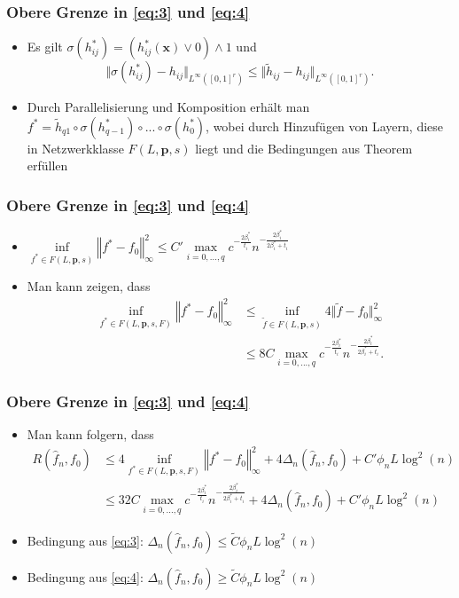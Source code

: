 \documentclass[hyperref={pdfpagelabels=false}]{beamer}
\begin{document}
\begin{frame}
\frametitle{Obere Grenze in \eqref{eq:3} und \eqref{eq:4}}
\begin{itemize}
\item Es gilt $\sigma (h^*_{ij}) = (h^*_{ij} (\mathbf{x}) \vee 0 ) \wedge 1$ und 
\begin{equation*} 
\Vert \sigma (h^*_{ij}) - h_{ij} \Vert _{L^\infty ([0,1]^r)} \leq \Vert \widetilde{h}_{ij} - h_{ij} \Vert _{L^\infty([0,1]^r)}.
\end{equation*}
\item Durch Parallelisierung und Komposition erhält man $f^* = \widetilde{h}_{q1} \circ \sigma (h^*_{q-1} ) \circ ... \circ \sigma(h^*_0)$, wobei durch Hinzufügen von Layern, diese in Netzwerkklasse $F(L,\mathbf{p},s)$ liegt und die Bedingungen aus Theorem erfüllen
\end{itemize}
\end{frame}

\begin{frame}
\frametitle{Obere Grenze in \eqref{eq:3} und \eqref{eq:4}}
\begin{itemize}
\item $\inf\limits_{f^* \in F(L,\mathbf{p}, s)} \left\Vert f^* - f_0 \right\Vert_\infty^2 \leq C' \max\limits_{i=0,...,q} c^{- \frac{2\beta_i^*}{t_i}} n^{- \frac{2\beta^*_i}{2\beta^*_i + t_i}}$
\item Man kann zeigen, dass \begin{align*}
\inf\limits_{f^* \in F(L,\mathbf{p},s, F)} \left\Vert f^* - f_0 \right\Vert ^2 _\infty & \leq \inf\limits_{\widetilde{f} \in F(L,\mathbf{p},s)} 4 \Vert \widetilde{f} - f_0\Vert_\infty^2 \\
&\leq8 C \max_{i=0,...,q} c^{- \frac{2\beta^*_i}{t_i}} n ^{-\frac{2\beta_i^*}{2\beta_i^* + t_i}}.
\end{align*}
\end{itemize}
\end{frame}

\begin{frame}
\frametitle{Obere Grenze in \eqref{eq:3} und \eqref{eq:4}}
\begin{itemize}
\item Man kann folgern, dass
\begin{align*}
R(\widehat{f}_n , f_0) & \leq 4 \inf\limits_{f^* \in F(L,\mathbf{p},s, F)} \left\Vert f^* - f_0 \right\Vert ^2 _\infty + 4\Delta_n(\widehat{f}_n , f_0) + C'\phi_n L \log^2(n)\\
& \leq 32 C \max\limits_{i=0,...,q} c^{- \frac{2\beta_i^*}{t_i}} n^{- \frac{2\beta^*_i}{2\beta^*_i + t_i}} + 4 \Delta_n(\widehat{f}_n , f_0) + C' \phi_n L \log^2(n)
\end{align*}
\item Bedingung aus \eqref{eq:3}: $\Delta _n (\widehat{f}_n,f_0) \leq \widetilde{C} \phi _n L \log^2(n)$
\item Bedingung aus \eqref{eq:4}: $\Delta _n (\widehat{f}_n,f_0) \geq \widetilde{C} \phi _n L \log^2(n)$
\end{itemize}
\end{frame}
\end{document}
